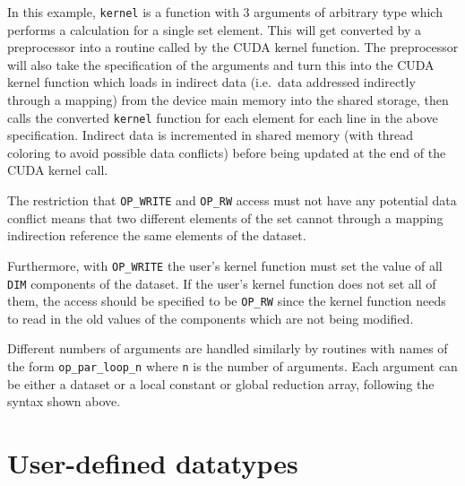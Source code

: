 \documentclass[11pt]{article}
\begin{document}
\noindent
In this example, {\tt kernel} is a function with 3 arguments of arbitrary type which
performs a calculation for a single set element.
This will get converted by a preprocessor into a routine called by the CUDA kernel 
function.  The preprocessor will also take the specification of the arguments and turn 
this into the CUDA kernel function which loads in indirect data (i.e.~data addressed 
indirectly through a mapping) from the device main memory into the shared storage, 
then calls the converted {\tt kernel} function for each element for each line in 
the above specification.  Indirect data is incremented in shared memory (with
thread coloring to avoid possible data conflicts) before being updated at the end 
of the CUDA kernel call.

The restriction that {\tt OP\_WRITE} and {\tt OP\_RW} access must not have any 
potential data conflict means that two different elements of the set cannot 
through a mapping indirection reference the same elements of the dataset.  


Furthermore, with {\tt OP\_WRITE} the user's kernel function must set the 
value of all {\tt DIM} components of the dataset.  If the user's kernel function
does not set all of them, the access should be specified to be {\tt OP\_RW}
since the kernel function needs to read in the old values of the components
which are not being modified. 

Different numbers of arguments are handled similarly by routines with names
of the form {\tt op\_par\_loop\_n} where {\tt n} is the number of arguments.
Each argument can be either a dataset or a local constant or global reduction 
array, following the syntax shown above.


\section{User-defined datatypes}
\end{document}
